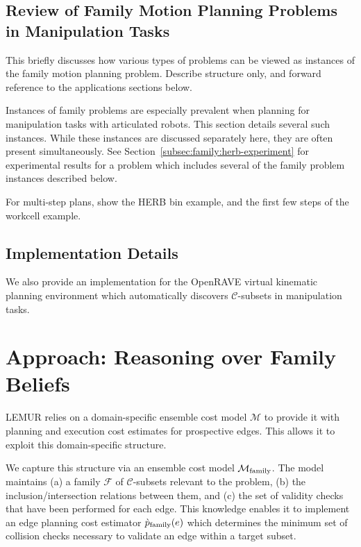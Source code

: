 \subsection{Review of Family Motion Planning Problems in Manipulation Tasks}

This briefly discusses how various types of problems can be viewed
as instances of the family motion planning problem.
Describe structure only, and forward reference to the applications
sections below.

Instances of family problems are especially prevalent when
planning for manipulation tasks with articulated robots.
This section details several such instances.
While these instances are discussed separately here,
they are often present simultaneously.
See Section~\ref{subsec:family:herb-experiment}
for experimental results for a problem
which includes several of the family problem instances
described below.

For multi-step plans, show the HERB bin example,
and the first few steps of the workcell example.

\subsection{Implementation Details}

We also provide an implementation for the
OpenRAVE \citep{diankov2010openrave}
virtual kinematic planning environment
which automatically discovers $\mathcal{C}$-subsets
in manipulation tasks.

\section{Approach: Reasoning over Family Beliefs}
\label{sec:family:approach}

LEMUR relies on a domain-specific ensemble cost model
$\mathcal{M}$ to provide it with planning and execution cost
estimates for prospective edges.
This allows it to exploit this domain-specific structure.

We capture this structure via an ensemble cost model
$\mathcal{M}_{\mbox{\scriptsize family}}$.
The model maintains
(a) a family $\mathcal{F}$ of $\mathcal{C}$-subsets
relevant to the problem,
(b) the inclusion/intersection relations between them,
and (c) the set of validity checks that have been performed
for each edge.
This knowledge enables it to implement an edge
planning cost estimator $\grave{p}_{\mbox{\scriptsize family}}(e)$
which determines the minimum set of collision checks necessary
to validate an edge within a target subset.

